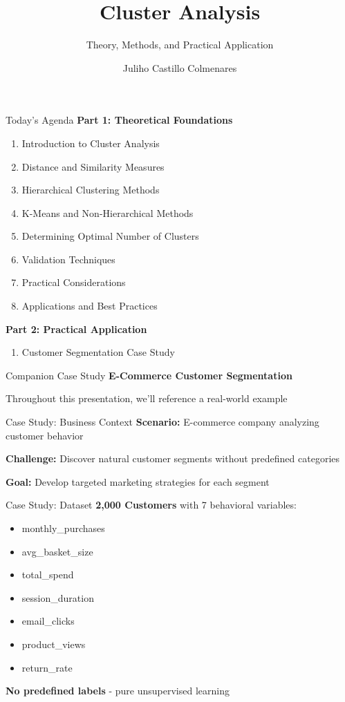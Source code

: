 \documentclass[aspectratio=169,ignorenonframetext]{beamer}
\title{\texorpdfstring{Cluster Analysis}{Cluster Analysis}}
\author{\texorpdfstring{Juliho Castillo
Colmenares}{Juliho Castillo Colmenares}}
\subtitle{Theory, Methods, and Practical Application}
\institute{Tec de Monterrey}
\date{}
\begin{document}
\frame{\titlepage}

\begin{frame}[shrink]{Today's Agenda}
\textbf{Part 1: Theoretical Foundations}

\begin{enumerate}
\item
  Introduction to Cluster Analysis
\item
  Distance and Similarity Measures
\item
  Hierarchical Clustering Methods
\item
  K-Means and Non-Hierarchical Methods
\item
  Determining Optimal Number of Clusters
\item
  Validation Techniques
\item
  Practical Considerations
\item
  Applications and Best Practices
\end{enumerate}

\textbf{Part 2: Practical Application}

\begin{enumerate}
\item
  Customer Segmentation Case Study
\end{enumerate}
\end{frame}

\begin{frame}{Companion Case Study}
\textbf{E-Commerce Customer Segmentation}

Throughout this presentation, we'll reference a real-world example
\end{frame}

\begin{frame}{Case Study: Business Context}
\textbf{Scenario:} E-commerce company analyzing customer behavior

\textbf{Challenge:} Discover natural customer segments without
predefined categories

\textbf{Goal:} Develop targeted marketing strategies for each segment
\end{frame}

\begin{frame}{Case Study: Dataset}
\textbf{2,000 Customers} with 7 behavioral variables:

\begin{itemize}
\item
  monthly\_purchases
\item
  avg\_basket\_size
\item
  total\_spend
\item
  session\_duration
\item
  email\_clicks
\item
  product\_views
\item
  return\_rate
\end{itemize}

\textbf{No predefined labels} - pure unsupervised learning
\end{frame}
\end{document}

